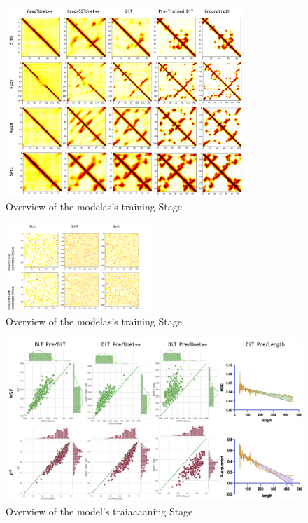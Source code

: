 \begin{figure}[]
    \begin{center}
    \includegraphics[width=0.8\textwidth]{3.png}
    \caption{Overview of the modelas's training Stage}\label{Trainig Stage}
    \end{center}
\end{figure}
\begin{figure}[]
    \begin{center}
    \includegraphics[width=0.5\textwidth]{svg.png}
    \caption{Overview of the modelas's training Stage}\label{Trainig Stage}
    \end{center}
\end{figure}
\begin{figure}[]
    \begin{center}
    \includegraphics[width=1.0\textwidth]{4.png}
    \caption{Overview of the model's traiaaaaning Stage}\label{Trainig Stage}
    \end{center}
\end{figure}


